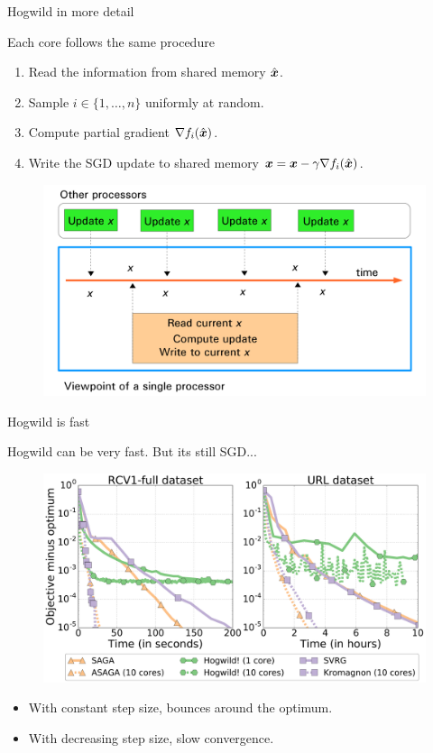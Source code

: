 \documentclass[10pt]{beamer}
\begin{document}
\begin{frame}{Hogwild in more detail}


Each core follows the same procedure
\begin{enumerate}
\item Read the information from shared memory $\hat{{\boldsymbol x}}$.
\item Sample $i \in \{1, \ldots, n\}$ uniformly at random.
\item Compute partial gradient $\nabla f_i(\hat{{\boldsymbol x}})$.
\item Write the SGD update to shared memory ${\boldsymbol x} = {\boldsymbol x} - \gamma \nabla f_i(\hat{{\boldsymbol x}})$.
\end{enumerate}
\pause
\begin{figure}
\centering\includegraphics[width=0.6\linewidth]{img/async_updates}
\end{figure}
\end{frame}

\begin{frame}{Hogwild is fast}

Hogwild can be very fast. 
But its still SGD...

\begin{figure}
\includegraphics[width=0.8\linewidth]{img/figure_comparison_hogwild}
\end{figure}

\begin{itemize}
\item With constant step size, bounces around the optimum.

\item With decreasing step size, slow convergence.
\end{itemize}
\end{frame}
\end{document}
